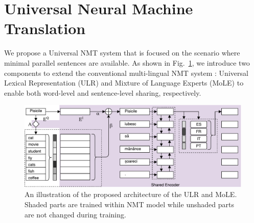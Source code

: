 
\section{Universal Neural Machine Translation}
We propose a Universal NMT system that is focused on the scenario where minimal parallel sentences are available. 
As shown in Fig.~\ref{cp5.fig.model}, we introduce two components to extend the conventional multi-lingual NMT system \cite{johnson2016google}: Universal Lexical Representation (ULR) and Mixture of Language Experts (MoLE) to enable both word-level and sentence-level sharing, respectively.
\begin{figure}[hptb]
	\centering
	\includegraphics[width=\linewidth]{figs/ulr/model2x}
      \caption{\label{cp5.fig.model} An illustration of the proposed architecture of the ULR and MoLE. Shaded parts are trained within NMT model while unshaded parts are not changed during  training.}
  \end{figure}

